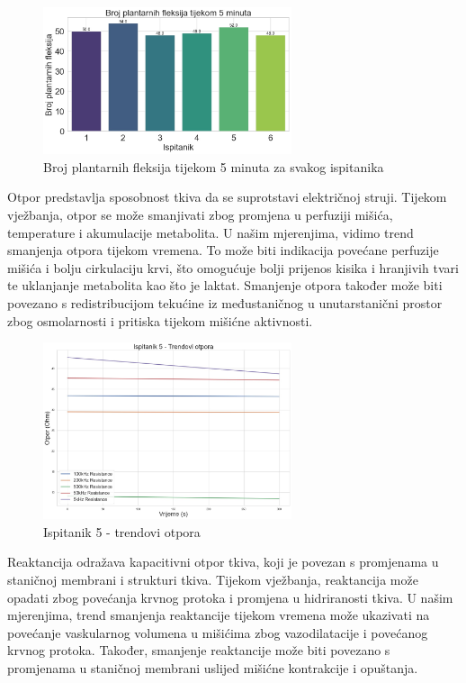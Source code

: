 \documentclass[../diplomski_rad.tex]{subfiles}
\begin{document}
\begin{figure}[htb]
    \centering
    \includegraphics[width=0.65\textwidth]{Figures/broj_fleksija.jpeg} 
    \caption{Broj plantarnih fleksija tijekom 5 minuta za svakog ispitanika}
    \label{slk:broj_fleksija}
\end{figure}

Otpor predstavlja sposobnost tkiva da se suprotstavi električnoj struji. 
Tijekom vježbanja, otpor se može smanjivati zbog promjena u perfuziji mišića, 
temperature i akumulacije metabolita. U našim mjerenjima, vidimo trend smanjenja otpora tijekom vremena. 
To može biti indikacija povećane perfuzije mišića i bolju cirkulaciju krvi, 
što omogućuje bolji prijenos kisika i hranjivih tvari te uklanjanje metabolita kao što je laktat. 
Smanjenje otpora također može biti povezano s redistribucijom tekućine iz 
međustaničnog u unutarstanični prostor zbog osmolarnosti i pritiska tijekom mišićne aktivnosti.

\begin{figure}[htb]
    \centering
    \includegraphics[width=0.65\textwidth]{Figures/trend.jpeg} 
    \caption{Ispitanik 5 - trendovi otpora}
    \label{slk:trend}
\end{figure}

Reaktancija odražava kapacitivni otpor tkiva, koji je povezan s promjenama u staničnoj membrani i strukturi tkiva. 
Tijekom vježbanja, reaktancija može opadati zbog povećanja krvnog protoka i promjena u hidriranosti tkiva. 
U našim mjerenjima, trend smanjenja reaktancije tijekom vremena može ukazivati na povećanje 
vaskularnog volumena u mišićima zbog vazodilatacije i povećanog krvnog protoka. 
Također, smanjenje reaktancije može biti povezano s promjenama u staničnoj membrani uslijed mišićne kontrakcije i opuštanja.
\end{document}
